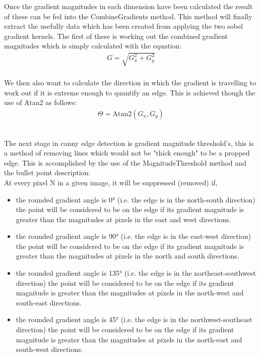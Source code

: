 \begin{FlushLeft}
    \bk

    Once the gradient magnitudes in each dimension have been calculated the result of these can be fed into the CombineGradients method. This method will finally extract the usefully data which has been created from applying the two sobel gradient kernels. The first of these is working out the combined gradient magnitudes which is simply calculated with the equation: \\
    
    \begin{gather*}
        G = \sqrt{G_x^2 + G_y^2}
    \end{gather*} \\
    
    We then also want to calculate the direction in which the gradient is travelling to work out if it is extreme enough to quantify an edge. This is achieved though the use of Atan2 as follows:\\
    
    \begin{gather*}
        \Theta = \text{Atan2}(G_x, G_y)
    \end{gather*} \\ 

    \bk

    The next stage in canny edge detection is gradient magnitude threshold's, this is a method of removing lines which would not be "thick enough" to be a propped edge. This is accomplished by the use of the MagnitudeThreshold method and the bullet point description: \\ 
    
    At every pixel N in a given image, it will be suppressed (removed) if,
    \begin{itemize}
        \item the rounded gradient angle is 0° (i.e. the edge is in the north-south direction) the point will be considered to be on the edge if its gradient magnitude is greater than the magnitudes at pixels in the east and west directions.
        \item the rounded gradient angle is 90° (i.e. the edge is in the east-west direction) the point will be considered to be on the edge if its gradient magnitude is greater than the magnitudes at pixels in the north and south directions.
        \item the rounded gradient angle is 135° (i.e. the edge is in the northeast-southwest direction) the point will be considered to be on the edge if its gradient magnitude is greater than the magnitudes at pixels in the north-west and south-east directions.
        \item the rounded gradient angle is 45° (i.e. the edge is in the northwest-southeast direction) the point will be considered to be on the edge if its gradient magnitude is greater than the magnitudes at pixels in the north-east and south-west directions.


\end{itemize}
\end{FlushLeft}
